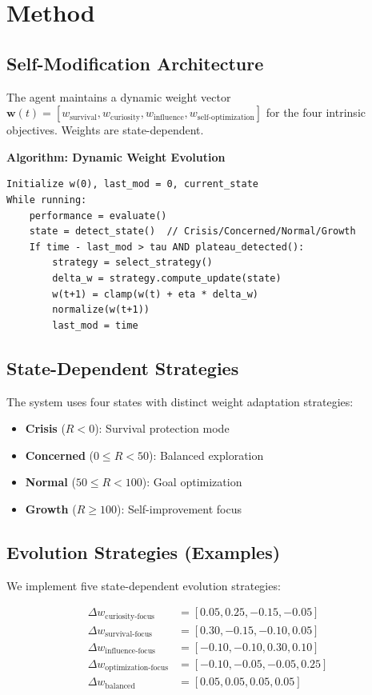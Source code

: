 \documentclass{article}
\begin{document}
\section{Method}

\subsection{Self-Modification Architecture}
The agent maintains a dynamic weight vector $\mathbf{w}(t) = [w_{\text{survival}}, w_{\text{curiosity}}, w_{\text{influence}}, w_{\text{self-optimization}}]$ for the four intrinsic objectives. Weights are state-dependent.

\textbf{Algorithm: Dynamic Weight Evolution}
\begin{verbatim}
Initialize w(0), last_mod = 0, current_state
While running:
    performance = evaluate()
    state = detect_state()  // Crisis/Concerned/Normal/Growth
    If time - last_mod > tau AND plateau_detected():
        strategy = select_strategy()
        delta_w = strategy.compute_update(state)
        w(t+1) = clamp(w(t) + eta * delta_w)
        normalize(w(t+1))
        last_mod = time
\end{verbatim}

\subsection{State-Dependent Strategies}
The system uses four states with distinct weight adaptation strategies:

\begin{itemize}
    \item \textbf{Crisis} ($R < 0$): Survival protection mode
    \item \textbf{Concerned} ($0 \leq R < 50$): Balanced exploration
    \item \textbf{Normal} ($50 \leq R < 100$): Goal optimization
    \item \textbf{Growth} ($R \geq 100$): Self-improvement focus
\end{itemize}

\subsection{Evolution Strategies (Examples)}
We implement five state-dependent evolution strategies:

\begin{align}
\Delta w_{\text{curiosity-focus}} &= [0.05, 0.25, -0.15, -0.05] \\
\Delta w_{\text{survival-focus}} &= [0.30, -0.15, -0.10, 0.05] \\
\Delta w_{\text{influence-focus}} &= [-0.10, -0.10, 0.30, 0.10] \\
\Delta w_{\text{optimization-focus}} &= [-0.10, -0.05, -0.05, 0.25] \\
\Delta w_{\text{balanced}} &= [0.05, 0.05, 0.05, 0.05]
\end{align}
\end{document}
